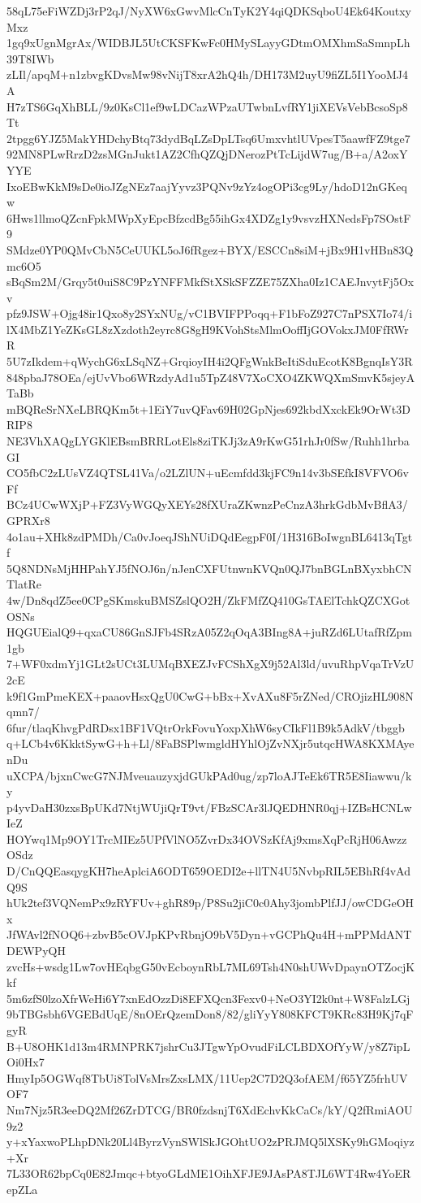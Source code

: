 58qL75eFiWZDj3rP2qJ/NyXW6xGwvMlcCnTyK2Y4qiQDKSqboU4Ek64KoutxyMxz
1gq9xUgnMgrAx/WIDBJL5UtCKSFKwFc0HMySLayyGDtmOMXhmSaSmnpLh39T8IWb
zLIl/apqM+n1zbvgKDvsMw98vNijT8xrA2hQ4h/DH173M2uyU9fiZL5I1YooMJ4A
H7zTS6GqXhBLL/9z0KsCl1ef9wLDCazWPzaUTwbnLvfRY1jiXEVsVebBcsoSp8Tt
2tpgg6YJZ5MakYHDchyBtq73dydBqLZsDpLTsq6UmxvhtlUVpesT5aawfFZ9tge7
92MN8PLwRrzD2zsMGnJukt1AZ2CfhQZQjDNerozPtTcLijdW7ug/B+a/A2oxYYYE
IxoEBwKkM9sDe0ioJZgNEz7aajYyvz3PQNv9zYz4ogOPi3cg9Ly/hdoD12nGKeqw
6Hws1llmoQZcnFpkMWpXyEpcBfzcdBg55ihGx4XDZg1y9vsvzHXNedsFp7SOstF9
SMdze0YP0QMvCbN5CeUUKL5oJ6fRgez+BYX/ESCCn8siM+jBx9H1vHBn83Qmc6O5
sBqSm2M/Grqy5t0uiS8C9PzYNFFMkfStXSkSFZZE75ZXha0Iz1CAEJnvytFj5Oxv
pfz9JSW+Ojg48ir1Qxo8y2SYxNUg/vC1BVIFPPoqq+F1bFoZ927C7nPSX7Io74/i
lX4MbZ1YeZKsGL8zXzdoth2eyrc8G8gH9KVohStsMlmOoffIjGOVokxJM0FfRWrR
5U7zIkdem+qWychG6xLSqNZ+GrqioyIH4i2QFgWnkBeItiSduEcotK8BgnqIsY3R
848pbaJ78OEa/ejUvVbo6WRzdyAd1u5TpZ48V7XoCXO4ZKWQXmSmvK5sjeyATaBb
mBQReSrNXeLBRQKm5t+1EiY7uvQFav69H02GpNjes692kbdXxckEk9OrWt3DRIP8
NE3VhXAQgLYGKlEBsmBRRLotEls8ziTKJj3zA9rKwG51rhJr0fSw/Ruhh1hrbaGI
CO5fbC2zLUsVZ4QTSL41Va/o2LZlUN+uEcmfdd3kjFC9n14v3bSEfkI8VFVO6vFf
BCz4UCwWXjP+FZ3VyWGQyXEYs28fXUraZKwnzPeCnzA3hrkGdbMvBflA3/GPRXr8
4o1au+XHk8zdPMDh/Ca0vJoeqJShNUiDQdEegpF0I/1H316BoIwgnBL6413qTgtf
5Q8NDNsMjHHPahYJ5fNOJ6n/nJenCXFUtnwnKVQn0QJ7bnBGLnBXyxbhCNTlatRe
4w/Dn8qdZ5ee0CPgSKmskuBMSZslQO2H/ZkFMfZQ410GsTAElTchkQZCXGotOSNs
HQGUEialQ9+qxaCU86GnSJFb4SRzA05Z2qOqA3BIng8A+juRZd6LUtafRfZpm1gb
7+WF0xdmYj1GLt2sUCt3LUMqBXEZJvFCShXgX9j52Al3ld/uvuRhpVqaTrVzU2cE
k9f1GmPmeKEX+paaovHsxQgU0CwG+bBx+XvAXu8F5rZNed/CROjizHL908Nqmn7/
6fur/tlaqKhvgPdRDsx1BF1VQtrOrkFovuYoxpXhW6syCIkFl1B9k5AdkV/tbggb
q+LCb4v6KkktSywG+h+Ll/8FaBSPlwmgldHYhlOjZvNXjr5utqcHWA8KXMAyenDu
uXCPA/bjxnCwcG7NJMveuauzyxjdGUkPAd0ug/zp7loAJTeEk6TR5E8Iiawwu/ky
p4yvDaH30zxsBpUKd7NtjWUjiQrT9vt/FBzSCAr3lJQEDHNR0qj+IZBsHCNLwIeZ
HOYwq1Mp9OY1TrcMIEz5UPfVlNO5ZvrDx34OVSzKfAj9xmsXqPcRjH06AwzzOSdz
D/CnQQEasqygKH7heAplciA6ODT659OEDI2e+llTN4U5NvbpRIL5EBhRf4vAdQ9S
hUk2tef3VQNemPx9zRYFUv+ghR89p/P8Su2jiC0c0Ahy3jombPlfJJ/owCDGeOHx
JfWAvl2fNOQ6+zbvB5cOVJpKPvRbnjO9bV5Dyn+vGCPhQu4H+mPPMdANTDEWPyQH
zvcHs+wsdg1Lw7ovHEqbgG50vEcboynRbL7ML69Tsh4N0shUWvDpaynOTZocjKkf
5m6zfS0lzoXfrWeHi6Y7xnEdOzzDi8EFXQcn3Fexv0+NeO3YI2k0nt+W8FalzLGj
9bTBGsbh6VGEBdUqE/8nOErQzemDon8/82/gliYyY808KFCT9KRc83H9Kj7qFgyR
B+U8OHK1d13m4RMNPRK7jshrCu3JTgwYpOvudFiLCLBDXOfYyW/y8Z7ipLOi0Hx7
HmyIp5OGWqf8TbUi8TolVsMrsZxsLMX/11Uep2C7D2Q3ofAEM/f65YZ5frhUVOF7
Nm7Njz5R3eeDQ2Mf26ZrDTCG/BR0fzdsnjT6XdEchvKkCaCs/kY/Q2fRmiAOU9z2
y+xYaxwoPLhpDNk20Ll4ByrzVynSWlSkJGOhtUO2zPRJMQ5lXSKy9hGMoqiyz+Xr
7L33OR62bpCq0E82Jmqc+btyoGLdME1OihXFJE9JAsPA8TJL6WT4Rw4YoERepZLa
